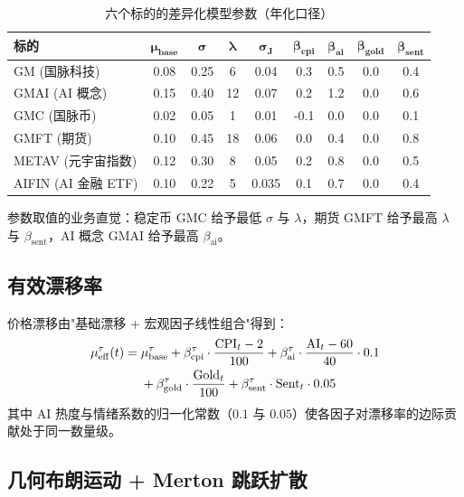 \documentclass[12pt,a4paper]{article}
\begin{document}
\begin{table}[h]
\centering
\setlength{\tabcolsep}{4pt}
\begin{tabular}{@{}lcccccccc@{}}
\toprule
\textbf{标的} & $\boldsymbol{\mu_{\text{base}}}$ & $\boldsymbol{\sigma}$ & $\boldsymbol{\lambda}$ & $\boldsymbol{\sigma_J}$ & $\boldsymbol{\beta_{\text{cpi}}}$ & $\boldsymbol{\beta_{\text{ai}}}$ & $\boldsymbol{\beta_{\text{gold}}}$ & $\boldsymbol{\beta_{\text{sent}}}$ \\
\midrule
GM (国脉科技)     & 0.08 & 0.25 & 6  & 0.04 & 0.3  & 0.5 & 0.0 & 0.4 \\
GMAI (AI 概念)    & 0.15 & 0.40 & 12 & 0.07 & 0.2  & 1.2 & 0.0 & 0.6 \\
GMC (国脉币)      & 0.02 & 0.05 & 1  & 0.01 & -0.1 & 0.0 & 0.0 & 0.1 \\
GMFT (期货)       & 0.10 & 0.45 & 18 & 0.06 & 0.0  & 0.4 & 0.0 & 0.8 \\
METAV (元宇宙指数)& 0.12 & 0.30 & 8  & 0.05 & 0.2  & 0.8 & 0.0 & 0.5 \\
AIFIN (AI 金融 ETF)& 0.10 & 0.22 & 5  & 0.035& 0.1  & 0.7 & 0.0 & 0.4 \\
\bottomrule
\end{tabular}
\caption{六个标的的差异化模型参数（年化口径）}
\end{table}

参数取值的业务直觉：稳定币 GMC 给予最低 $\sigma$ 与 $\lambda$，期货 GMFT 给予最高 $\lambda$ 与 $\beta_{\mathrm{sent}}$，AI 概念 GMAI 给予最高 $\beta_{\mathrm{ai}}$。

\subsection{有效漂移率}

价格漂移由"基础漂移 + 宏观因子线性组合"得到：
\begin{align}
\mu^{\tau}_{\mathrm{eff}}(t) ={}& \mu^{\tau}_{\mathrm{base}} + \beta^{\tau}_{\mathrm{cpi}} \cdot \frac{\mathrm{CPI}_t - 2}{100} + \beta^{\tau}_{\mathrm{ai}} \cdot \frac{\mathrm{AI}_t - 60}{40} \cdot 0.1 \notag \\
& + \beta^{\tau}_{\mathrm{gold}} \cdot \frac{\mathrm{Gold}_t}{100} + \beta^{\tau}_{\mathrm{sent}} \cdot \mathrm{Sent}_t \cdot 0.05
\end{align}
其中 AI 热度与情绪系数的归一化常数（$0.1$ 与 $0.05$）使各因子对漂移率的边际贡献处于同一数量级。

\subsection{几何布朗运动 + Merton 跳跃扩散}
\end{document}
